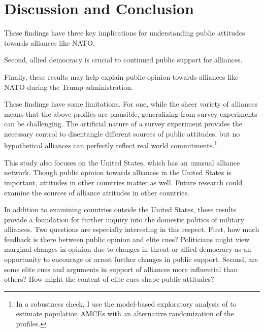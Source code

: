 \documentclass[12pt]{article}
\begin{document}
\section{Discussion and Conclusion} 









These findings have three key implications for understanding public attitudes towards alliances like NATO. 


Second, allied democracy is crucial to continued public support for alliances.



Finally, these results may help explain public opinion towards alliances like NATO during the Trump administration.


These findings have some limitations. 
For one, while the sheer variety of alliances means that the above profiles are plausible, generalizing from survey experiments can be challenging. 
The artificial nature of a survey experiment provides the necessary control to disentangle different sources of public attitudes, but no hypothetical alliances can perfectly reflect real world commitments.\footnote{In a robustness check, I use the model-based exploratory analysis of \citet{delaCuestaetal2021} to estimate population AMCEs with an alternative randomization of the profiles.}


This study also focuses on the United States, which has an unusual alliance network. 
Though public opinion towards alliances in the United States is important, attitudes in other countries matter as well. 
Future research could examine the sources of alliance attitudes in other countries. 


In addition to examining countries outside the United States, these results provide a foundation for further inquiry into the domestic politics of military alliances. 
Two questions are especially interesting in this respect.
First, how much feedback is there between public opinion and elite cues? 
Politicians might view marginal changes in opinion due to changes in threat or allied democracy as an opportunity to encourage or arrest further changes in public support.
Second, are some elite cues and arguments in support of alliances more influential than others? 
How might the content of elite cues shape public attitudes? 
\end{document}
